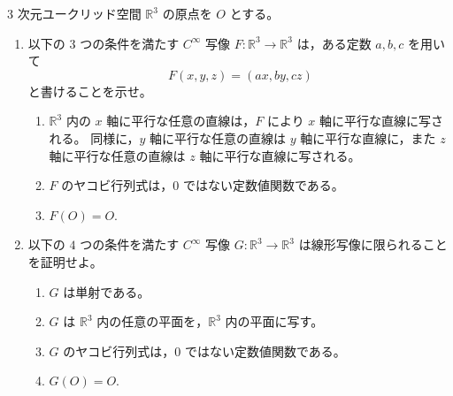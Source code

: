 \documentclass[12pt]{jlreq}
\newcommand{\R}{\mathbb{R}}
\begin{document}
\(3\) 次元ユークリッド空間 \(\R^3\) の原点を \(O\) とする。

\begin{enumerate}
  \item 以下の \(3\) つの条件を満たす \(C^\infty\) 写像 \(F:\R^3\to\R^3\) は，ある定数 \(a,b,c\) を用いて
  \[
    F(x,y,z)=(ax,by,cz)
  \]
  と書けることを示せ。
  \begin{enumerate}
    \item[(i)] \(\R^3\) 内の \(x\) 軸に平行な任意の直線は，\(F\) により \(x\) 軸に平行な直線に写される。
    同様に，\(y\) 軸に平行な任意の直線は \(y\) 軸に平行な直線に，また \(z\) 軸に平行な任意の直線は \(z\) 軸に平行な直線に写される。
    \item[(ii)] \(F\) のヤコビ行列式は，\(0\) ではない定数値関数である。
    \item[(iii)] \(F(O)=O\).
  \end{enumerate}
  \item 以下の \(4\) つの条件を満たす \(C^\infty\) 写像 \(G:\R^3\to\R^3\) は線形写像に限られることを証明せよ。
  \begin{enumerate}
    \item[(o)] \(G\) は単射である。
    \item[(i)] \(G\) は \(\R^3\) 内の任意の平面を，\(\R^3\) 内の平面に写す。
    \item[(ii)] \(G\) のヤコビ行列式は，\(0\) ではない定数値関数である。
    \item[(iii)] \(G(O)=O\).
  \end{enumerate}
\end{enumerate}
\end{document}
